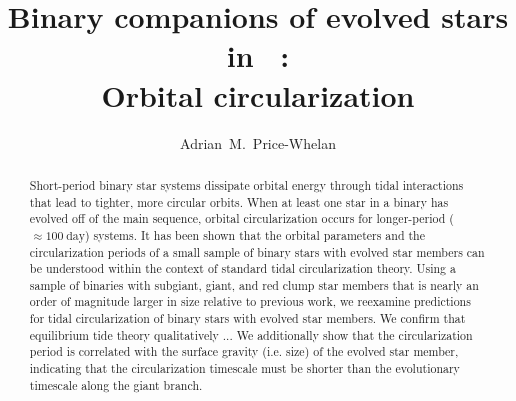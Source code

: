 \documentclass[modern, letterpaper]{aastex62}
\newcommand{\apogee}{\project{\acronym{APOGEE}}}
\newcommand{\DR}{\acronym{DR14}}
\begin{document}
\sloppy\sloppypar\raggedbottom\frenchspacing %

\title{Binary companions of evolved stars in \apogee\ \DR: \\
       Orbital circularization}

\author[0000-0003-0872-7098]{Adrian~M.~Price-Whelan}



\begin{abstract}\noindent %
Short-period binary star systems dissipate orbital energy through tidal
interactions that lead to tighter, more circular orbits.
When at least one star in a binary has evolved off of the main sequence, orbital
circularization occurs for longer-period ($\approx 100~\textrm{day}$) systems.
It has been shown that the orbital parameters and the circularization periods of
a small sample of binary stars with evolved star members can be understood
within the context of standard tidal circularization theory.
Using a sample of binaries with subgiant, giant, and red clump star members that
is nearly an order of magnitude larger in size relative to previous work, we
reexamine predictions for tidal circularization of binary stars with evolved
star members.
We confirm that equilibrium tide theory qualitatively ...
We additionally show that the circularization period is correlated with the
surface gravity (i.e. size) of the evolved star member, indicating that the
circularization timescale must be shorter than the evolutionary timescale along
the giant branch.
\end{abstract}
\end{document}
